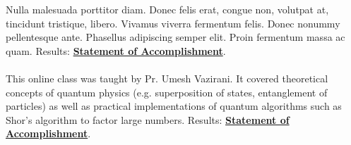 \documentclass[theme]{cv_einstein}
\begin{document}
\begin{paracol}{2}
\begin{leftcolumn*}
{{\begin{minipage}[l]{0.9\leftcolwidth}
                \end{minipage}
            }%
        } %
        \end{leftcolumn*}
        \begin{rightcolumn}\noindent \small
            \hspace{-2.4pt}
            {Nulla malesuada porttitor diam. Donec felis erat, congue non, volutpat at, tincidunt tristique, libero. Vivamus viverra fermentum felis. Donec nonummy pellentesque ante. Phasellus adipiscing semper elit. Proin fermentum massa ac quam.}
            {Results: \href{http://example.com}{\textbf{Statement of Accomplishment}}.
            }\\
            \vspace{\itemspace}\\
            {This online class was taught by Pr. Umesh Vazirani. It covered theoretical concepts of quantum physics (e.g. superposition of states, entanglement of particles) as well as practical implementations of quantum algorithms such as Shor's algorithm to factor large numbers.}
            {Results: \href{http://example.com}{\textbf{Statement of Accomplishment}}.}


\end{rightcolumn}
\end{paracol}
\end{document}
